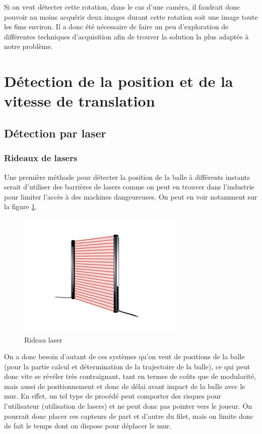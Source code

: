 Si on veut détecter cette rotation, dans le cas d'une caméra, il faudrait donc pouvoir au moins acquérir deux images durant cette rotation soit une image toute les 6ms environ. Il a donc été nécessaire de faire un peu d'exploration de différentes techniques d'acquisition afin de trouver la solution la plus adaptée à notre problème.


\section{Détection de la position et de la vitesse de translation}



\subsection{Détection par laser}

\subsubsection{Rideaux de lasers}

Une première méthode pour détecter la position de la balle à différents instants serait d'utiliser des barrières de lasers comme on peut en trouver dans l'industrie pour limiter l'accès à des machines dangeureuses. On peut en voir notamment sur la figure \ref{img:rideaulasers}. \\

\begin{figure}[H]
\begin{center}
\includegraphics{rideaulaser.png}
\caption{Rideau laser}
\label{img:rideaulasers}
\end{center}
\end{figure}

On a donc besoin d'autant de ces systèmes qu'on veut de positions de la balle (pour la partie calcul et détermination de la trajectoire de la balle), ce qui peut donc vite se révéler très contraignant, tant en termes de coûts que de modularité, mais aussi de positionnement et donc de délai avant impact de la balle avec le mur. En effet, un tel type de procédé peut comporter des risques pour l'utilisateur (utilisation de lasers) et ne peut donc pas pointer vers le joueur. On pourrait donc placer ces capteurs de part et d'autre du filet, mais on limite donc de fait le temps dont on dispose pour déplacer le mur. \\

